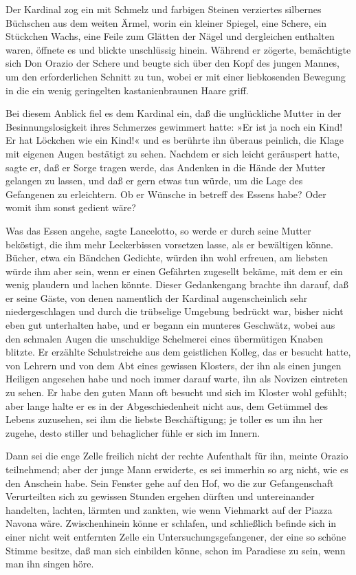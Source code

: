 Der Kardinal zog ein mit Schmelz und farbigen Steinen verziertes
silbernes Büchschen aus dem weiten Ärmel, worin ein kleiner
Spiegel, eine Schere, ein Stückchen Wachs, eine Feile zum Glätten
der Nägel und dergleichen enthalten waren, öffnete es und blickte
unschlüssig hinein. Während er zögerte, bemächtigte sich Don Orazio
der Schere und beugte sich über den Kopf des jungen Mannes, um den
erforderlichen Schnitt zu tun, wobei er mit einer liebkosenden
Bewegung in die ein wenig geringelten kastanienbraunen Haare
griff.

Bei diesem Anblick fiel es dem Kardinal ein, daß die unglückliche
Mutter in der Besinnungslosigkeit ihres Schmerzes gewimmert hatte:
»Er ist ja noch ein Kind! Er hat Löckchen wie ein Kind!« und es
berührte ihn überaus peinlich, die Klage mit eigenen Augen
bestätigt zu sehen. Nachdem er sich leicht geräuspert hatte, sagte
er, daß er Sorge tragen werde, das Andenken in die Hände der Mutter
gelangen zu lassen, und daß er gern etwas tun würde, um die Lage
des Gefangenen zu erleichtern. Ob er Wünsche in betreff des Essens
habe? Oder womit ihm sonst gedient wäre?

Was das Essen angehe, sagte Lancelotto, so werde er durch seine
Mutter beköstigt, die ihm mehr Leckerbissen \pagenum{[62]}
vorsetzen lasse, als er bewältigen könne. Bücher, etwa ein Bändchen
Gedichte, würden ihn wohl erfreuen, am liebsten würde ihm aber
sein, wenn er einen Gefährten zugesellt bekäme, mit dem er ein
wenig plaudern und lachen könnte. Dieser Gedankengang brachte ihn
darauf, daß er seine Gäste, von denen namentlich der Kardinal
augenscheinlich sehr niedergeschlagen und durch die trübselige
Umgebung bedrückt war, bisher nicht eben gut unterhalten habe, und
er begann ein munteres Geschwätz, wobei aus den schmalen Augen die
unschuldige Schelmerei eines übermütigen Knaben blitzte. Er
erzählte Schulstreiche aus dem geistlichen Kolleg, das er besucht
hatte, von Lehrern und von dem Abt eines gewissen Klosters, der ihn
als einen jungen Heiligen angesehen habe und noch immer darauf
warte, ihn als Novizen eintreten zu sehen. Er habe den guten Mann
oft besucht und sich im Kloster wohl gefühlt; aber lange halte er
es in der Abgeschiedenheit nicht aus, dem Getümmel des Lebens
zuzusehen, sei ihm die liebste Beschäftigung; je toller es um ihn
her zugehe, desto stiller und behaglicher fühle er sich im Innern.

Dann sei die enge Zelle freilich nicht der rechte Aufenthalt für
ihn, meinte Orazio teilnehmend; aber der junge Mann erwiderte, es
sei immerhin so arg nicht, wie es den Anschein habe. Sein Fenster
gehe auf den Hof, wo die zur Gefangenschaft Verurteilten sich zu
gewissen Stunden ergehen dürften und untereinander handelten,
lachten, lärmten und zankten, wie wenn Viehmarkt auf der Piazza
Navona wäre. Zwischenhinein könne er schlafen, und schließlich
befinde sich in einer nicht weit entfernten Zelle ein
Untersuchungsgefangener, der eine so schöne Stimme besitze, daß man
sich einbilden könne, schon im Paradiese zu sein, wenn man ihn
singen höre.

